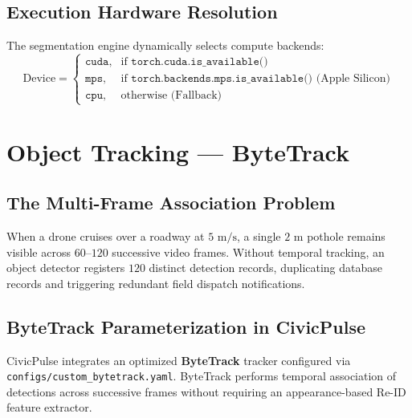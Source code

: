 \documentclass[11pt,a4paper]{article}
\begin{document}
\subsection{Execution Hardware Resolution}
The segmentation engine dynamically selects compute backends:
\begin{equation}
\text{Device} = \begin{cases}
\texttt{cuda}, & \text{if } \texttt{torch.cuda.is\_available()} \\
\texttt{mps}, & \text{if } \texttt{torch.backends.mps.is\_available()} \text{ (Apple Silicon)} \\
\texttt{cpu}, & \text{otherwise (Fallback)}
\end{cases}
\end{equation}

\section{Object Tracking --- ByteTrack}

\subsection{The Multi-Frame Association Problem}
When a drone cruises over a roadway at $5\text{ m/s}$, a single $2\text{ m}$ pothole remains visible across $60$--$120$ successive video frames. Without temporal tracking, an object detector registers $120$ distinct detection records, duplicating database records and triggering redundant field dispatch notifications.

\subsection{ByteTrack Parameterization in CivicPulse}
CivicPulse integrates an optimized \textbf{ByteTrack} tracker configured via \texttt{configs/custom\_bytetrack.yaml}. ByteTrack performs temporal association of detections across successive frames without requiring an appearance-based Re-ID feature extractor.
\end{document}
